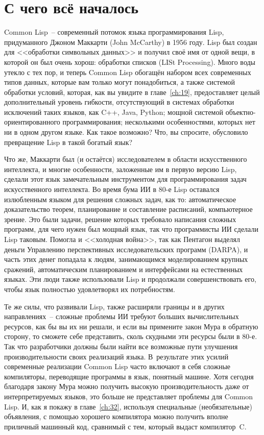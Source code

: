 \section{С чего всё началось}

Common Lisp~-- современный потомок языка программирования Lisp, придуманного Джоном
Маккарти (John McCarthy) в 1956 году. Lisp был создан для <<обработки символьных
данных>> и получил своё имя от
одной вещи, в которой он был очень хорош: обработки списков (LISt Processing). Много воды
утекло с тех пор, и теперь Common Lisp обогащён набором всех современных типов данных, которые
вам только могут понадобиться, а также системой обработки условий, которая, как вы
увидите в главе~\ref{ch:19}, предоставляет целый дополнительный уровень гибкости, отсутствующий в системах обработки
исключений таких языков, как C++, Java, Python; мощной системой объектно-ориентированного
программирования; несколькими особенностями, которых нет ни в одном другом языке. Как
такое возможно? Что, вы спросите, обусловило превращение Lisp в такой богатый язык?

Что же, Маккарти был (и остаётся)
исследователем в области искусственного интеллекта, и многие
особенности, заложенные им в первую версию Lisp, сделали этот язык замечательным
инструментом для программирования задач искусственного интеллекта. Во время бума ИИ в 80-е Lisp
оставался излюбленным языком для решения сложных задач, как то: автоматическое
доказательство теорем, планирование и составление расписаний, компьютерное зрение. Это
были задачи, решение которых требовало написания сложных программ, для чего нужен был мощный язык,
так что программисты ИИ сделали Lisp таковым. Помогла и <<холодная война>>, так как Пентагон
выделял деньги Управлению перспективных исследовательских программ (DARPA), и часть этих
денег попадала к людям, занимающимся моделированием крупных сражений, автоматическим
планированием и интерфейсами на естественных языках. Эти люди также использовали Lisp и
продолжали совершенствовать его, чтобы язык полностью удовлетворял их потребностям.

Те же силы, что развивали Lisp, также расширяли границы и в других направлениях~--
сложные проблемы ИИ требуют больших вычислительных ресурсов, как бы вы их ни решали, и
если вы примените закон Мура в обратную сторону, то сможете себе представить, сколь
скудными эти ресурсы были в 80-е. Так что разработчики должны были найти все возможные
пути улучшения производительности своих реализаций языка. В~результате этих усилий
современные реализации Common Lisp часто включают в себя сложные компиляторы, переводящие
программы в язык,
понятный машине. Хотя сегодня благодаря закону Мура можно получить высокую
производительность даже от интерпретируемых языков, это больше не представляет проблемы для
Common Lisp. И, как я покажу в главе~\ref{ch:32}, используя специальные (необязательные)
объявления, с помощью хорошего компилятора можно получить вполне приличный машинный код,
сравнимый с тем, который выдаст компилятор~C.

